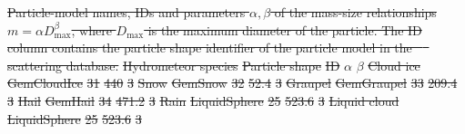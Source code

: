 \documentclass[journal abbreviation, manuscript]{copernicus}
\providecommand{\DIFdel}[1]{{\protect\color{red}\sout{#1}}}                      %
\providecommand{\DIFdelbegin}{} %
\providecommand{\DIFdelFL}[1]{\DIFdel{#1}} %
\begin{document}
\DIFdelbegin %
{%
\DIFdelFL{Particle-model names, IDs and parameters $\alpha, \beta$ of the
    mass-size relationships $m = \alpha D_\text{max}^\beta$, where
    $D_\text{max}$ is the maximum diameter of the particle. The ID column
    contains the particle shape identifier of the particle model in the
    \mbox{%
\citet{eriksson18} }\hspace{0pt}%
scattering database.}}
\DIFdelFL{Hydrometeor species }%
\DIFdelFL{Particle shape }%
\DIFdelFL{ID }%
\DIFdelFL{$\alpha$ }%
\DIFdelFL{$\beta$ }%
\DIFdelFL{Cloud ice    }%
\DIFdelFL{GemCloudIce  }%
\DIFdelFL{31 }%
\DIFdelFL{440   }%
\DIFdelFL{3 }%
\DIFdelFL{Snow         }%
\DIFdelFL{GemSnow      }%
\DIFdelFL{32 }%
\DIFdelFL{52.4  }%
\DIFdelFL{3 }%
\DIFdelFL{Graupel      }%
\DIFdelFL{GemGraupel   }%
\DIFdelFL{33 }%
\DIFdelFL{209.4 }%
\DIFdelFL{3 }%
\DIFdelFL{Hail         }%
\DIFdelFL{GemHail      }%
\DIFdelFL{34 }%
\DIFdelFL{471.2 }%
\DIFdelFL{3 }%
\DIFdelFL{Rain         }%
\DIFdelFL{LiquidSphere }%
\DIFdelFL{25 }%
\DIFdelFL{523.6 }%
\DIFdelFL{3 }%
\DIFdelFL{Liquid cloud }%
\DIFdelFL{LiquidSphere }%
\DIFdelFL{25 }%
\DIFdelFL{523.6 }%
\DIFdelFL{3 }%
\end{document}
